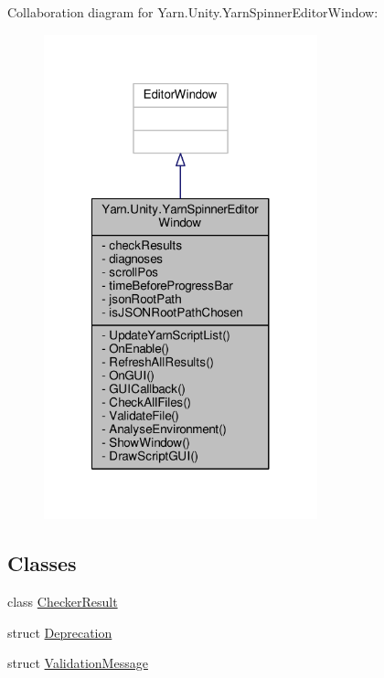Collaboration diagram for Yarn.\-Unity.\-Yarn\-Spinner\-Editor\-Window\-:
\nopagebreak
\begin{figure}[H]
\begin{center}
\leavevmode
\includegraphics[width=224pt]{a00699}
\end{center}
\end{figure}
\subsection*{Classes}
\begin{DoxyCompactItemize}
\item 
class \hyperlink{a00047}{Checker\-Result}
\item 
struct \hyperlink{a00086}{Deprecation}
\item 
struct \hyperlink{a00164_a00355}{Validation\-Message}
\end{DoxyCompactItemize}
